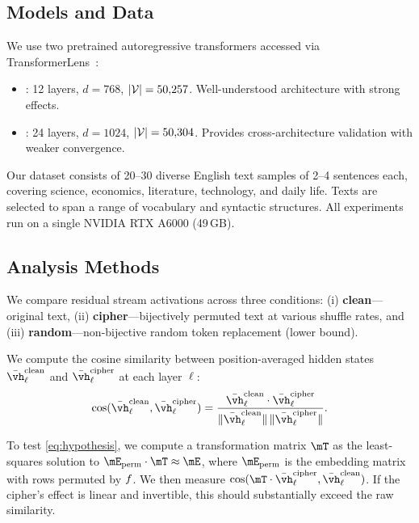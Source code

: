 \subsection{Models and Data}
\label{sec:models}

We use two pretrained autoregressive transformers accessed via TransformerLens~\citep{nanda2022transformerlens}:

\begin{itemize}[leftmargin=*,itemsep=0pt,topsep=0pt]
    \item \gpttwo: 12 layers, $d = 768$, $|\mathcal{V}| = 50{,}257$. Well-understood architecture with strong \layernorm effects.
    \item \pythia: 24 layers, $d = 1024$, $|\mathcal{V}| = 50{,}304$. Provides cross-architecture validation with weaker \layernorm convergence.
\end{itemize}

Our dataset consists of 20--30 diverse English text samples of 2--4 sentences each, covering science, economics, literature, technology, and daily life. Texts are selected to span a range of vocabulary and syntactic structures. All experiments run on a single NVIDIA RTX A6000 (49\,GB).

\subsection{Analysis Methods}
\label{sec:analysis}

We compare residual stream activations across three conditions: (i) \textbf{clean}---original text, (ii) \textbf{cipher}---bijectively permuted text at various shuffle rates, and (iii) \textbf{random}---non-bijective random token replacement (lower bound).

 We compute the cosine similarity between position-averaged hidden states $\bar{\vh}_\ell^{\text{clean}}$ and $\bar{\vh}_\ell^{\text{cipher}}$ at each layer $\ell$:
\begin{equation}
\cossim(\bar{\vh}_\ell^{\text{clean}}, \bar{\vh}_\ell^{\text{cipher}}) = \frac{\bar{\vh}_\ell^{\text{clean}} \cdot \bar{\vh}_\ell^{\text{cipher}}}{\|\bar{\vh}_\ell^{\text{clean}}\| \, \|\bar{\vh}_\ell^{\text{cipher}}\|}.
\end{equation}

 To test \eqref{eq:hypothesis}, we compute a transformation matrix $\permmat$ as the least-squares solution to $\embmat_{\text{perm}} \cdot \permmat \approx \embmat$, where $\embmat_{\text{perm}}$ is the embedding matrix with rows permuted by $f$. We then measure $\cossim(\permmat \cdot \bar{\vh}_\ell^{\text{cipher}}, \bar{\vh}_\ell^{\text{clean}})$. If the cipher's effect is linear and invertible, this should substantially exceed the raw similarity.

